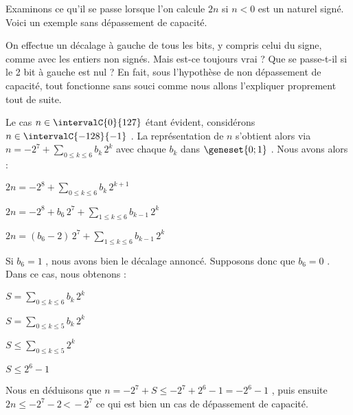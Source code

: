 Examinons ce qu'il se passe lorsque l'on calcule  $2 n$ si $n < 0$ est un naturel signé.
Voici un exemple sans dépassement de capacité.


\medskip


\medskip


\medskip


On effectue un décalage à gauche de tous les bits, y compris celui du signe, comme avec les entiers non signés.
Mais est-ce toujours vrai ? Que se passe-t-il si le 2\ieme{} bit à gauche est nul ?
En fait, sous l'hypothèse de non dépassement de capacité, tout fonctionne sans souci comme nous allons l'expliquer proprement tout de suite.

\medskip

Le cas $n \in \intervalC{0}{127}$ étant évident, considérons $n \in \intervalC{-128}{-1}$ .
La représentation de $n$ s'obtient alors via
$\displaystyle n = -2^7 + \sum_{0 \leq k \leq 6} b_k \, 2^k$ avec chaque $b_k$ dans $\geneset{0 ; 1}$ .
Nous avons alors :

\medskip

$\displaystyle 2 n 
	= -2^8 + \sum_{0 \leq k \leq 6} b_k \, 2^{k+1}$

\smallskip

$\displaystyle 2 n 
	= -2^8 + b_6 \, 2^7 + \sum_{1 \leq k \leq 6} b_{k-1} \, 2^k$

\smallskip

$\displaystyle 2 n 
	= (b_6 - 2) \, 2^7 + \sum_{1 \leq k \leq 6} b_{k-1} \, 2^k$

\medskip

Si $b_6 = 1$ , nous avons bien le décalage annoncé. Supposons donc que $b_6 = 0$ . Dans ce cas, nous obtenons :

\medskip

$\displaystyle S = \sum_{0 \leq k \leq 6} b_k \, 2^k$

\smallskip

$\displaystyle S = \sum_{0 \leq k \leq 5} b_k \, 2^k$

\smallskip

$\displaystyle S \leq \sum_{0 \leq k \leq 5} 2^k$

\smallskip

$\displaystyle S \leq 2^6 - 1$

\medskip

Nous en déduisons que $n = -2^7 + S \leq -2^7 + 2^6 - 1 = -2^6 - 1$ , puis ensuite $2n \leq -2^7 - 2 \, \text{<} \, -2^7$ ce qui est bien un cas de dépassement de capacité.
